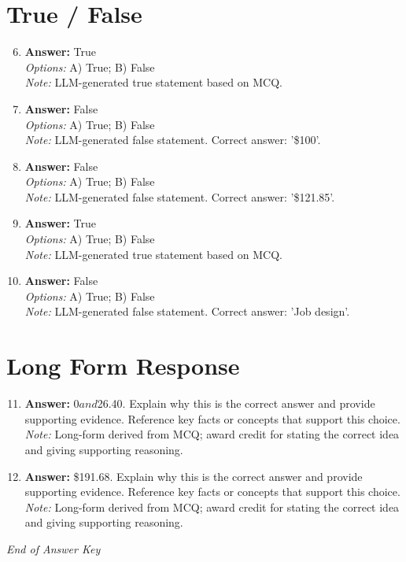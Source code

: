 \documentclass[12pt]{article}
\begin{document}
\section*{True / False}
\begin{enumerate}[label=\arabic*.]
\setcounter{enumi}{5}
\item \textbf{Answer:} True
\\ \textit{Options:} A) True; B) False
\\ \textit{Note:} LLM-generated true statement based on MCQ.
\item \textbf{Answer:} False
\\ \textit{Options:} A) True; B) False
\\ \textit{Note:} LLM-generated false statement. Correct answer: '\$100'.
\item \textbf{Answer:} False
\\ \textit{Options:} A) True; B) False
\\ \textit{Note:} LLM-generated false statement. Correct answer: '\$121.85'.
\item \textbf{Answer:} True
\\ \textit{Options:} A) True; B) False
\\ \textit{Note:} LLM-generated true statement based on MCQ.
\item \textbf{Answer:} False
\\ \textit{Options:} A) True; B) False
\\ \textit{Note:} LLM-generated false statement. Correct answer: 'Job design'.
\end{enumerate}

\section*{Long Form Response}
\begin{enumerate}[label=\arabic*.]
\setcounter{enumi}{10}
\item \textbf{Answer:} $0 and $26.40. Explain why this is the correct answer and provide supporting evidence. Reference key facts or concepts that support this choice.
\\ \textit{Note:} Long-form derived from MCQ; award credit for stating the correct idea and giving supporting reasoning.
\item \textbf{Answer:} \$191.68. Explain why this is the correct answer and provide supporting evidence. Reference key facts or concepts that support this choice.
\\ \textit{Note:} Long-form derived from MCQ; award credit for stating the correct idea and giving supporting reasoning.
\end{enumerate}

\vfill
\noindent\textit{End of Answer Key}
\end{document}

